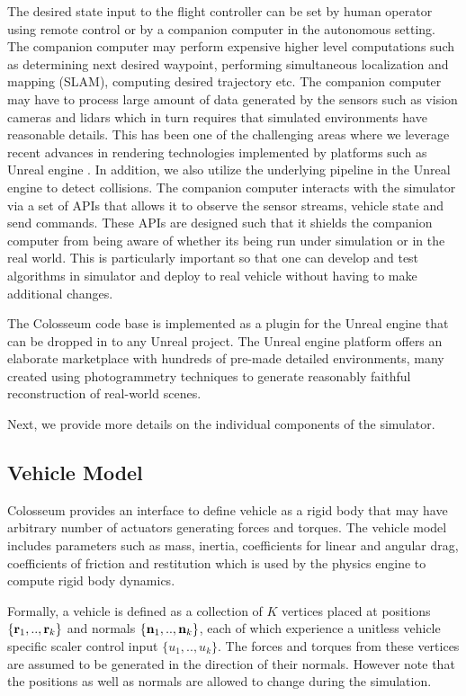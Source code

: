 \documentclass[graybox]{svmult}
\begin{document}
	The desired state input to the flight controller can be set by human operator using remote control or by a companion computer in the autonomous setting. The companion computer may perform expensive higher level computations such as determining next desired waypoint, performing simultaneous localization and mapping (SLAM), computing desired trajectory etc. The companion computer may have to process large amount of data generated by the sensors such as vision cameras and lidars which in turn requires that simulated environments have reasonable details. This has been one of the challenging areas where we leverage recent advances in rendering technologies implemented by platforms such as Unreal engine \cite{karis2013real}. In addition, we also utilize the underlying pipeline in the Unreal engine to detect collisions. The companion computer interacts with the simulator via a set of APIs that allows it to observe the sensor streams, vehicle state and send commands. These APIs are designed such that it shields the companion computer from being aware of whether its being run under simulation or in the real world. This is particularly important so that one can develop and test algorithms in simulator and deploy to real vehicle without having to make additional changes.
	
	The Colosseum code base is implemented as a plugin for the Unreal engine that can be dropped in to any Unreal project. The Unreal engine platform offers an elaborate marketplace with hundreds of pre-made detailed environments, many created using photogrammetry techniques \cite{ue4openworld2015} to generate reasonably faithful reconstruction of real-world scenes.
	
	Next, we provide more details on the individual components of the simulator.
	
	\subsection{Vehicle Model}
	\label{sec:Vehicle}
	Colosseum provides an interface to define vehicle as a rigid body that may have arbitrary number of actuators generating forces and torques. The vehicle model includes parameters such as mass, inertia, coefficients for linear and angular drag, coefficients of friction and restitution which is used by the physics engine to compute rigid body dynamics. 
	
	Formally, a vehicle is defined as a collection of $K$ vertices placed at positions $\{{\bf r}_1, .., {\bf r}_k\}$ and normals $\{{\bf n}_1, .., {\bf n}_k\}$, each of which experience a unitless vehicle specific scaler control input $\{u_1, .., u_k\}$. The forces and torques from these vertices are assumed to be generated in the direction of their normals. However note that the positions as well as normals are allowed to change during the simulation.
	
\end{document}
